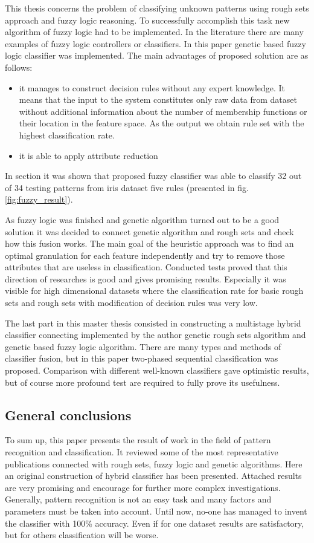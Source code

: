This thesis concerns the problem of classifying unknown patterns using rough
sets approach and fuzzy logic reasoning. To successfully accomplish this task
new algorithm of fuzzy logic had to be implemented. In the literature there are
many examples of fuzzy logic controllers or classifiers. In this paper genetic
based fuzzy logic classifier was implemented. The main advantages of proposed
solution are as follows:
\begin{itemize}
    \item it manages to construct decision rules without any expert knowledge.
        It means that the input to the system constitutes only raw data from
        dataset without additional information about the number of membership
        functions or their location in the feature space. As the output we
        obtain rule set with the highest classification rate. 
    \item it is able to apply attribute reduction
\end{itemize}
In section \label{cha:Simulation_reaearch_3} it was shown that proposed fuzzy
classifier was able to classify 32 out of 34 testing patterns from iris dataset
five rules (presented in fig. \ref{fig:fuzzy_result}).

As fuzzy logic was finished and genetic algorithm turned out to be a good
solution it was decided to connect genetic algorithm and rough sets and check
how this fusion works. The main goal of the heuristic approach was to find an
optimal granulation for each feature independently and try to remove those
attributes that are useless in classification. Conducted tests proved that
this direction of researches is good and gives promising results. Especially it
was visible for high dimensional datasets where the classification rate for
basic rough sets and rough sets with modification of decision rules was very
low. 

The last part in this master thesis consisted in constructing a multistage 
hybrid classifier connecting implemented by the author genetic rough sets
algorithm and genetic based fuzzy logic algorithm. There are many types and
methods of classifier fusion, but in this paper two-phased sequential
classification was proposed. Comparison with different well-known classifiers
gave optimistic results, but of course more profound test are required to fully
prove its usefulness.
\subsection{General conclusions}
To sum up, this paper presents the result of work in the field of pattern
recognition and classification. It reviewed some of the most representative 
publications connected with rough sets, fuzzy logic and genetic algorithms.
Here an original construction of hybrid classifier has been presented. Attached
results are very promising and encourage for further more complex
investigations. Generally, pattern recognition is not an easy task and many
factors and parameters must be taken into account. Until now, no-one has
managed to invent the classifier with 100\% accuracy. Even if for one dataset
results are satisfactory, but for others classification will be worse.
